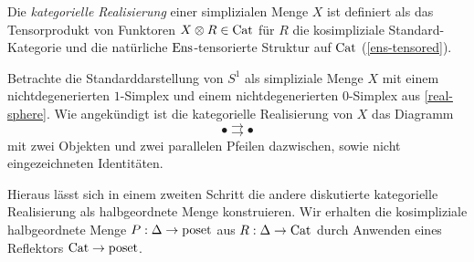 \begin{defn}
  Die \emph{kategorielle Realisierung} einer simplizialen Menge $X$
  ist definiert als das Tensorprodukt von Funktoren $X \otimes R \in
  \operatorname{Cat}$ für $R$ die kosimpliziale Standard-Kategorie und die
  natürliche $\operatorname{Ens}$-tensorierte Struktur auf $\operatorname{Cat}$
  (\ref{ens-tensored}).
\end{defn}
\begin{bsp} \label{ex:s1-diagram}
  Betrachte die Standarddarstellung von $S^1$ als simpliziale Menge
  $X$ mit einem nichtdegenerierten $1$-Simplex und einem
  nichtdegenerierten $0$-Simplex aus \ref{real-sphere}. Wie
  angekündigt ist die kategorielle Realisierung von $X$ das Diagramm
  \[ \bullet \rightrightarrows \bullet \]
  mit zwei Objekten und zwei parallelen Pfeilen dazwischen, sowie
  nicht eingezeichneten Identitäten.
\end{bsp}

Hieraus lässt sich in einem zweiten Schritt die andere diskutierte
kategorielle Realisierung als halbgeordnete Menge konstruieren. Wir
erhalten die kosimpliziale halbgeordnete Menge $P: \Delta \to \operatorname{poset}$
aus $R: \Delta \to \operatorname{Cat}$ durch Anwenden eines Reflektors $\operatorname{Cat} \to
\operatorname{poset}$.

